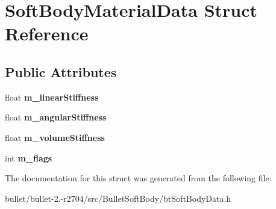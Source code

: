 \hypertarget{struct_soft_body_material_data}{\section{Soft\+Body\+Material\+Data Struct Reference}
\label{struct_soft_body_material_data}
}
\subsection*{Public Attributes}
\begin{DoxyCompactItemize}
\item 
\hypertarget{struct_soft_body_material_data_a10a3ccf32511c85b9eb62ad97553312d}{float {\bfseries m\+\_\+linear\+Stiffness}}\label{struct_soft_body_material_data_a10a3ccf32511c85b9eb62ad97553312d}

\item 
\hypertarget{struct_soft_body_material_data_adb5b47c720ed05e42e12c74eedba9d8b}{float {\bfseries m\+\_\+angular\+Stiffness}}\label{struct_soft_body_material_data_adb5b47c720ed05e42e12c74eedba9d8b}

\item 
\hypertarget{struct_soft_body_material_data_a564fb4279b51e7cf3aa0e7844f55f2c8}{float {\bfseries m\+\_\+volume\+Stiffness}}\label{struct_soft_body_material_data_a564fb4279b51e7cf3aa0e7844f55f2c8}

\item 
\hypertarget{struct_soft_body_material_data_a89ac411b007b81cd72bb7fa42176f205}{int {\bfseries m\+\_\+flags}}\label{struct_soft_body_material_data_a89ac411b007b81cd72bb7fa42176f205}

\end{DoxyCompactItemize}


The documentation for this struct was generated from the following file\+:\begin{DoxyCompactItemize}
\item 
bullet/bullet-\/2.-\/r2704/src/\+Bullet\+Soft\+Body/bt\+Soft\+Body\+Data.\+h\end{DoxyCompactItemize}
